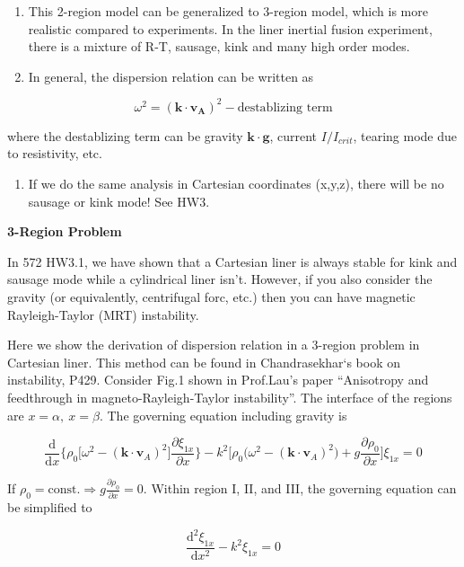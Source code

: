 \documentclass[
  notoc %
]{tufte-book}
\providecommand{\tightlist}{%
  \setlength{\itemsep}{0pt}\setlength{\parskip}{0pt}
}
\begin{document}
\begin{enumerate}
\def\labelenumi{\arabic{enumi}.}
\tightlist
\item
  This 2-region model can be generalized to 3-region model, which is
  more realistic compared to experiments. In the liner inertial fusion
  experiment, there is a mixture of R-T, sausage, kink and many high
  order modes.
\item
  In general, the dispersion relation can be written as
\end{enumerate}

\[
\omega^2 = (\mathbf{k}\cdot\mathbf{v_A})^2 - \text{destablizing term}
\]

where the destablizing term can be gravity
\(\mathbf{k}\cdot\mathbf{g}\), current \(I/I_{crit}\), tearing mode due
to resistivity, etc.

\begin{enumerate}
\def\labelenumi{\arabic{enumi}.}
\setcounter{enumi}{2}
\tightlist
\item
  If we do the same analysis in Cartesian coordinates (x,y,z), there
  will be no sausage or kink mode! See HW3.
\end{enumerate}

\textbf{3-Region Problem}

In 572 HW3.1, we have shown that a Cartesian liner is always stable for
kink and sausage mode while a cylindrical liner isn't. However, if you
also consider the gravity (or equivalently, centrifugal forc, etc.) then
you can have magnetic Rayleigh-Taylor (MRT) instability.

Here we show the derivation of dispersion relation in a 3-region problem
in Cartesian liner. This method can be found in Chandrasekhar`s book on
instability, P429. Consider Fig.1 shown in Prof.Lau's paper ``Anisotropy
and feedthrough in magneto-Rayleigh-Taylor instability''. The interface
of the regions are \(x=\alpha,\ x=\beta\). The governing equation
including gravity is

\[
\frac{\mathrm{d}}{\mathrm{d}x}\Big\{ \rho_0\big[ \omega^2-(\mathbf{k}\cdot\mathbf{v}_A)^2\big] \frac{\partial \xi_{1x}}{\partial x} \Big\}
- k^2 \big[ \rho_0\big( \omega^2 - (\mathbf{k}\cdot\mathbf{v}_A)^2\big)+g\frac{\partial \rho_0}{\partial x}\big] \xi_{1x} = 0
\]

If
\(\rho_0=\text{const.}\Rightarrow g\frac{\partial \rho_0}{\partial x}=0\).
Within region I, II, and III, the governing equation can be simplified
to

\[
\frac{\mathrm{d}^2 \xi_{1x}}{\mathrm{d}x^2} - k^2\xi_{1x} = 0
\]
\end{document}

